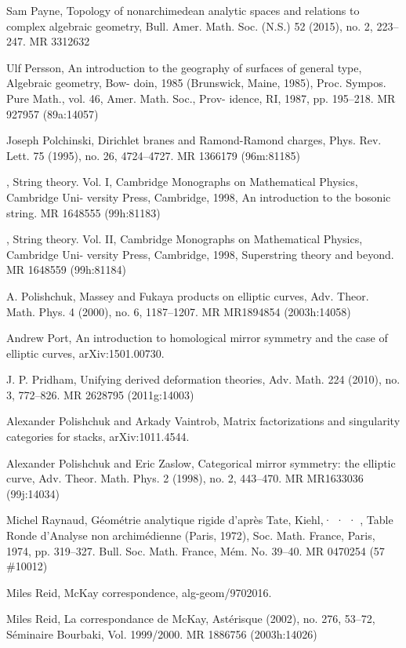{\begin{list}{}{%
  \setlength{\leftmargin}{3.4em}%
  \setlength{\itemindent}{-3.4em}%
  \setlength{\itemsep}{1.5pt}%
  \setlength{\parsep}{0pt}%
  \setlength{\listparindent}{0pt}%
}
\item[{[Pay15]}] Sam Payne, Topology of nonarchimedean analytic spaces and relations to complex algebraic geometry, Bull. Amer. Math. Soc. (N.S.) 52 (2015), no. 2, 223--247. MR 3312632
\item[{[Per87]}] Ulf Persson, An introduction to the geography of surfaces of general type, Algebraic geometry, Bow- doin, 1985 (Brunswick, Maine, 1985), Proc. Sympos. Pure Math., vol. 46, Amer. Math. Soc., Prov- idence, RI, 1987, pp. 195--218. MR 927957 (89a:14057)
\item[{[Pol95]}] Joseph Polchinski, Dirichlet branes and Ramond-Ramond charges, Phys. Rev. Lett. 75 (1995), no. 26, 4724--4727. MR 1366179 (96m:81185)
\item[{[Pol98a]}] , String theory. Vol. I, Cambridge Monographs on Mathematical Physics, Cambridge Uni- versity Press, Cambridge, 1998, An introduction to the bosonic string. MR 1648555 (99h:81183)
\item[{[Pol98b]}] , String theory. Vol. II, Cambridge Monographs on Mathematical Physics, Cambridge Uni- versity Press, Cambridge, 1998, Superstring theory and beyond. MR 1648559 (99h:81184)
\item[{[Pol00]}] A. Polishchuk, Massey and Fukaya products on elliptic curves, Adv. Theor. Math. Phys. 4 (2000), no. 6, 1187--1207. MR MR1894854 (2003h:14058)
\item[{[Por]}] Andrew Port, An introduction to homological mirror symmetry and the case of elliptic curves, arXiv:1501.00730.
\item[{[Pri10]}] J. P. Pridham, Unifying derived deformation theories, Adv. Math. 224 (2010), no. 3, 772--826. MR 2628795 (2011g:14003)
\item[{[PV]}] Alexander Polishchuk and Arkady Vaintrob, Matrix factorizations and singularity categories for stacks, arXiv:1011.4544.
\item[{[PZ98]}] Alexander Polishchuk and Eric Zaslow, Categorical mirror symmetry: the elliptic curve, Adv. Theor. Math. Phys. 2 (1998), no. 2, 443--470. MR MR1633036 (99j:14034)
\item[{[Ray74]}] Michel Raynaud, Géométrie analytique rigide d’après Tate, Kiehl,· · · , Table Ronde d’Analyse non archimédienne (Paris, 1972), Soc. Math. France, Paris, 1974, pp. 319--327. Bull. Soc. Math. France, Mém. No. 39--40. MR 0470254 (57 \#10012)
\item[{[Rei]}] Miles Reid, McKay correspondence, alg-geom/9702016.
\item[{[Rei02]}] Miles Reid, La correspondance de McKay, Astérisque (2002), no. 276, 53--72, Séminaire Bourbaki, Vol. 1999/2000. MR 1886756 (2003h:14026)

\end{list}}
